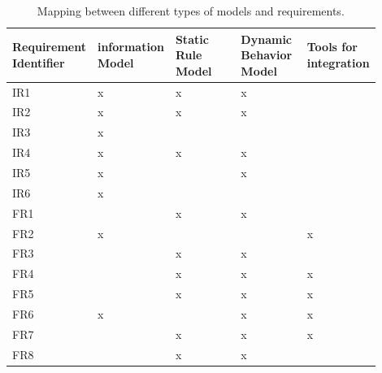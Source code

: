\documentclass[runningheads]{llncs}
\begin{document}
\begin{table}[htbp]
\caption{Mapping between different types of models and requirements.}
\begin{center}
\begin{tabular}{p{0.18\linewidth}|p{0.18\linewidth}p{0.18\linewidth}p{0.18\linewidth}>{\centering\arraybackslash}p{0.18\linewidth}}
\hline
    \centering \textbf{Requirement Identifier} & \centering \textbf{information Model} & \centering \textbf{Static Rule Model} & \centering \textbf{Dynamic Behavior Model} &  \textbf{Tools for integration}\\
    \hline
    \centering IR1 & \centering x & \centering x & \centering x & \\\hline
    \centering IR2 & \centering x & \centering x & \centering x & \\\hline
    \centering IR3 & \centering x & & & \\\hline
    \centering IR4 & \centering x & \centering x & \centering x & \\\hline
    \centering IR5 & \centering x & & \centering x & \\\hline
    \centering IR6 & \centering x & & & \\\hline
    \centering FR1 & & \centering x & \centering x & \\\hline
    \centering FR2 & \centering x & & & x\\\hline
    \centering FR3 & & \centering x & \centering x & \\\hline
    \centering FR4 & & \centering x & \centering x & x\\\hline
    \centering FR5 & & \centering x & \centering x & x\\\hline
    \centering FR6 & \centering x & & \centering x & x\\\hline
    \centering FR7 & & \centering x & \centering x & x\\\hline
    \centering FR8 & & \centering x & \centering x & \\\hline

\end{tabular}
\label{modelirfr}
\end{center}
\end{table}
\end{document}
